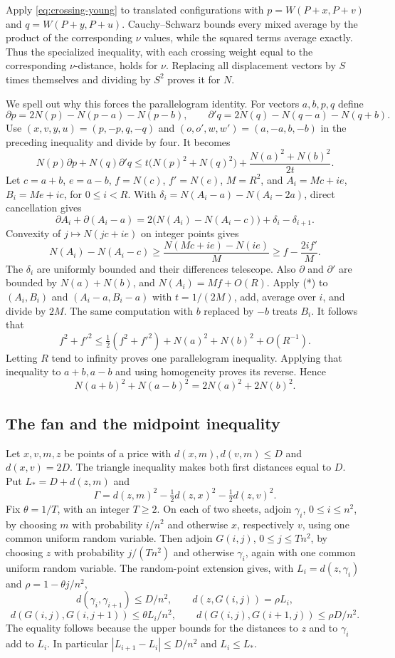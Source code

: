 Apply \eqref{eq:crossing-young} to translated configurations with
$p=W(P+x,P+v)$ and $q=W(P+y,P+u)$.
Cauchy--Schwarz bounds every mixed average by the product of the
corresponding $\nu$ values, while the squared terms average
exactly. Thus the specialized inequality, with each crossing
weight equal to the corresponding $\nu$-distance, holds for $\nu$.
Replacing all displacement vectors by $S$ times themselves and
dividing by $S^2$ proves it for $N$.

We spell out why this forces the parallelogram identity.
For vectors $a,b,p,q$ define
\[
 \partial p=2N(p)-N(p-a)-N(p-b),\qquad
 \partial' q=2N(q)-N(q-a)-N(q+b).
\]
Use $(x,v,y,u)=(p,-p,q,-q)$ and
$(o,o',w,w')=(a,-a,b,-b)$ in the preceding inequality and
divide by four. It becomes
\[
 N(p)\partial p+N(q)\partial'q
 \leq t\bigl(N(p)^2+N(q)^2\bigr)
       +\frac{N(a)^2+N(b)^2}{2t}.
 \tag{*}
\]
Let $c=a+b$, $e=a-b$, $f=N(c)$, $f'=N(e)$, $M=R^2$, and
$A_i=Mc+ie$, $B_i=Me+ic$, for $0\leq i<R$.
With $\delta_i=N(A_i-a)-N(A_i-2a)$, direct cancellation gives
\[
 \partial A_i+\partial(A_i-a)
 =2\bigl(N(A_i)-N(A_i-c)\bigr)+\delta_i-\delta_{i+1}.
\]
Convexity of $j\mapsto N(jc+ie)$ on integer points gives
\[
 N(A_i)-N(A_i-c)
 \geq \frac{N(Mc+ie)-N(ie)}M
 \geq f-\frac{2if'}M.
\]
The $\delta_i$ are uniformly bounded and their differences
telescope. Also $\partial$ and $\partial'$ are bounded by
$N(a)+N(b)$, and $N(A_i)=Mf+O(R)$.
Apply (*) to $(A_i,B_i)$ and $(A_i-a,B_i-a)$ with
$t=1/(2M)$, add, average over $i$, and divide by $2M$.
The same computation with $b$ replaced by $-b$ treats $B_i$.
It follows that
\[
 f^2+f'^2
 \leq \tfrac12(f^2+f'^2)+N(a)^2+N(b)^2+O(R^{-1}).
\]
Letting $R$ tend to infinity proves one parallelogram inequality.
Applying that inequality to $a+b,a-b$ and using homogeneity
proves its reverse. Hence
\begin{equation}
 N(a+b)^2+N(a-b)^2=2N(a)^2+2N(b)^2 .
 \label{eq:average-parallelogram}
\end{equation}

\subsection{The fan and the midpoint inequality}

Let $x,v,m,z$ be points of a price with
$d(x,m),d(v,m)\leq D$ and $d(x,v)=2D$.
The triangle inequality makes both first distances equal to $D$.
Put $L_*=D+d(z,m)$ and
\[
 \Gamma=d(z,m)^2-\tfrac12d(z,x)^2-\tfrac12d(z,v)^2.
\]
Fix $\theta=1/T$, with an integer $T\geq2$.
On each of two sheets, adjoin $\gamma_i$, $0\leq i\leq n^2$,
by choosing $m$ with probability $i/n^2$ and otherwise $x$,
respectively $v$, using one common uniform random variable.
Then adjoin $G(i,j)$, $0\leq j\leq Tn^2$, by choosing $z$
with probability $j/(Tn^2)$ and otherwise $\gamma_i$,
again with one common uniform random variable.
The random-point extension gives, with $L_i=d(z,\gamma_i)$
and $\rho=1-\theta j/n^2$,
\[
 d(\gamma_i,\gamma_{i+1})\leq D/n^2,\qquad
 d(z,G(i,j))=\rho L_i,
\]
\[
 d(G(i,j),G(i,j+1))\leq \theta L_i/n^2,\qquad
 d(G(i,j),G(i+1,j))\leq \rho D/n^2.
 \tag{**}
\]
The equality follows because the upper bounds for the distances
to $z$ and to $\gamma_i$ add to $L_i$.
In particular $|L_{i+1}-L_i|\leq D/n^2$ and $L_i\leq L_*$.

